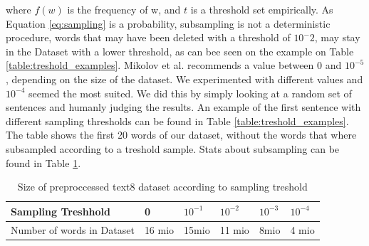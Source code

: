 where $f(w)$ is the frequency of w, and $t$ is a threshold set empirically. As Equation \ref{eq:sampling} is a probability, subsampling is not a deterministic procedure, words that may have been deleted with a threshold of $10^-2$, may stay in the Dataset with a lower threshold, as can bee seen on the example on Table \ref{table:treshold_examples}. Mikolov et al.  recommends a value between $0$ and $10^{-5}$, depending on the size of the dataset. We experimented with different values and $10^{-4}$ seemed the most suited. We did this by simply looking at a random set of sentences and humanly judging the results. An example of the first sentence with different sampling thresholds can be found in Table \ref{table:treshold_examples}. The table shows the first 20 words of our dataset, without the words that where subsampled according to a treshold sample. Stats about subsampling can be found in Table \ref{table:treshold}. 
\begin{table}[h]
\centering
\begin{tabular}{|l|l|l|l|l|l|}
\hline
Sampling Treshhold &  0      &      $ 10^{-1}$&$   10^{-2}$& $10^{-3}     $ &$10^{-4}   $    \\ \hline
Number of words in Dataset    & 16 mio & 15mio & 11 mio & 8mio & 4 mio \\ \hline
\end{tabular}
\caption{Size of preproccessed text8 dataset according to sampling treshold}
\label{table:treshold}
\end{table}


